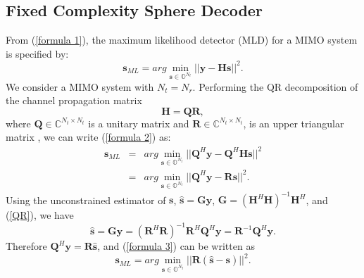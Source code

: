 \documentclass[letterpaper, 10pt, conference,twoside]{ieeeconf}
\begin{document}
\subsection{Fixed Complexity Sphere Decoder}
From (\ref{formula 1}), the maximum likelihood detector (MLD) for a MIMO system is specified by:
\begin{equation}
\mathbf{s}_{ML}=arg\min_{\mathbf{s}\in \mathbb{O}^{N_{t}}}||\mathbf{y}-\mathbf{H}\mathbf{s}||^{2}. \label{formula 2}
\end{equation}
We consider a MIMO system with  $N_{t}=N_{r}$. Performing the QR decomposition of the channel propagation matrix
\begin{equation}
 \mathbf{H}=\mathbf{Q}\mathbf{R},  \label{QR}
\end{equation}
where $\mathbf{Q}\in \mathbb{C}^{N_{t}\times N_{t}}$ is a unitary matrix and $\mathbf{R}\in \mathbb{C}^{N_{t}\times N_{t}}$, is an upper triangular matrix \cite{golub2012matrix}, we can write (\ref{formula 2}) as:
\begin{eqnarray}
\nonumber
\mathbf{s}_{ML}&=&arg\min_{\mathbf{s}\in \mathbb{O}^{N_{t}}}||\mathbf{Q}^{H}\mathbf{y}-\mathbf{Q}^{H}\mathbf{H}\mathbf{s}||^{2}\\
&=& arg\min_{\mathbf{s}\in \mathbb{O}^{N_{t}}}||\mathbf{Q}^{H}\mathbf{y}-\mathbf{R}\mathbf{s}||^{2}. \label{formula 3}
\end{eqnarray}
Using the unconstrained estimator of $\mathbf{s}$, $\mathbf{\hat{s}}=\mathbf{G}\mathbf{y}$, $\mathbf{G}=(\mathbf{H}^{H}\mathbf{H})^{-1}\mathbf{H}^{H}$, and (\ref{QR}), we have  
\begin{equation}
\mathbf{\hat{s}}=\mathbf{G}\mathbf{y}=(\mathbf{R}^{H}\mathbf{R})^{-1}\mathbf{R}^{H}\mathbf{Q}^{H}\mathbf{y}
=\mathbf{R}^{-1}\mathbf{Q}^{H}\mathbf{y}.
\label{unconstrained estimation}
\end{equation} 
Therefore $\mathbf{Q}^{H}\mathbf{y}=\mathbf{R}\mathbf{\hat{s}}$, and (\ref{formula 3}) can be written as
\begin{equation}
\mathbf{s}_{ML}=arg\min_{\mathbf{s}\in \mathbb{O}^{N_{t}}}||\mathbf{R}(\mathbf{\hat{s}}-\mathbf{s})||^{2}. \label{formula 4}
\end{equation}
\end{document}
